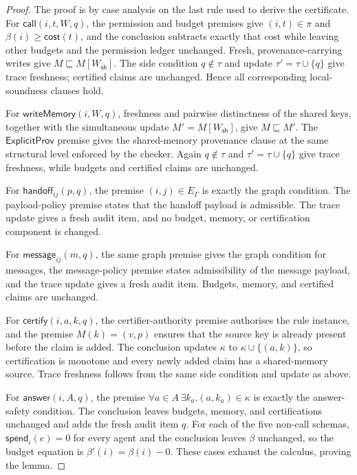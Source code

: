 \documentclass[a4paper,fleqn]{cas-sc}
\newcommand{\cost}{\mathsf{cost}}
\begin{document}
\begin{proof}
The proof is by case analysis on the last rule used to derive the certificate. For \(\mathsf{call}(i,t,W,q)\), the permission and budget premises give \((i,t)\in\pi\) and \(\beta(i)\ge\cost(t)\), and the conclusion subtracts exactly that cost while leaving other budgets and the permission ledger unchanged. Fresh, provenance-carrying writes give \(M\sqsubseteq M[W_{\mathsf{sh}}]\). The side condition \(q\notin\tau\) and update \(\tau' = \tau\cup\{q\}\) give trace freshness; certified claims are unchanged. Hence all corresponding local-soundness clauses hold.

For \(\mathsf{writeMemory}(i,W,q)\), freshness and pairwise distinctness of
the shared keys, together with the simultaneous update
\(M'=M[W_{\mathsf{sh}}]\), give \(M\sqsubseteq M'\). The
\(\mathsf{ExplicitProv}\) premise gives the shared-memory provenance clause at the
same structural level enforced by the checker. Again \(q\notin\tau\) and
\(\tau'=\tau\cup\{q\}\) give trace freshness, while budgets and certified
claims are unchanged.

For \(\mathsf{handoff}_{ij}(p,q)\), the premise \((i,j)\in E_{\Gamma}\) is exactly the graph condition. The payload-policy premise states that the handoff payload is admissible. The trace update gives a fresh audit item, and no budget, memory, or certification component is changed.

For \(\mathsf{message}_{ij}(m,q)\), the same graph premise gives the graph condition for messages, the message-policy premise states admissibility of the message payload, and the trace update gives a fresh audit item. Budgets, memory, and certified claims are unchanged.

For \(\mathsf{certify}(i,a,k,q)\), the certifier-authority premise authorises the rule instance, and the premise \(M(k)=(v,p)\) ensures that the source key is already present before the claim is added. The conclusion updates \(\kappa\) to \(\kappa\cup\{(a,k)\}\), so certification is monotone and every newly added claim has a shared-memory source. Trace freshness follows from the same side condition and update as above.

For \(\mathsf{answer}(i,A,q)\), the premise \(\forall a\in A\,\exists k_a.(a,k_a)\in\kappa\) is exactly the answer-safety condition. The conclusion leaves budgets, memory, and certifications unchanged and adds the fresh audit item \(q\). For each of the five non-call schemas,
\(\mathsf{spend}_i(e)=0\) for every agent and the conclusion leaves \(\beta\)
unchanged, so the budget equation is \(\beta'(i)=\beta(i)-0\). These cases
exhaust the calculus, proving the lemma.
\end{proof}
\end{document}
